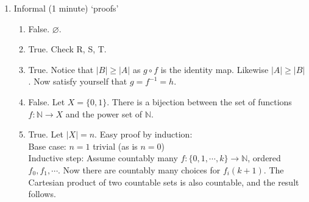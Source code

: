 \documentclass[10pt,a4paper]{article}
\begin{document}
\begin{enumerate}
    \item Informal (1 minute) `proofs'
    \begin{enumerate}
        \item False. \( \varnothing \).
        \item True. Check R, S, T.
        \item True.
        Notice that \( |B| \ge |A| \) as \( g \circ f \) is the identity map.
        Likewise \( |A| \ge |B| \).
        Now satisfy yourself that \( g = f^{-1} = h \).
        \item False. Let \(X = \{ 0, 1 \} \).
        There is a bijection between the set of functions \( f : \mathbb{N} \rightarrow X \) 
        and the power set of \(\mathbb{N}\).
        \item True. Let \(|X| = n\). Easy proof by induction: \\
        Base case: \(n=1\) trivial (as is \(n=0\)) \\
        Inductive step: Assume countably many \( f : \{0, 1, \cdots , k\} \rightarrow \mathbb{N} \), 
        ordered \( f_0, f_1, \cdots \). Now there are countably many choices for \( f_i (k+1) \).
        The Cartesian product of two countable sets is also countable, and the result follows.
    \end{enumerate}
\end{enumerate}
\end{document}
